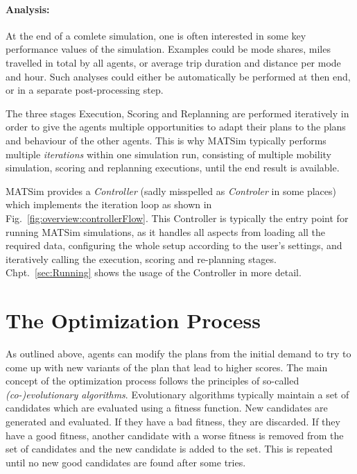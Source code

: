 \paragraph{Analysis:}
At the end of a comlete simulation, one is often interested in some key
performance values of the simulation. Examples could be mode shares, miles
travelled in total by all agents, or average trip duration and distance per
mode and hour. Such analyses could either be automatically be performed at then
end, or in a separate post-processing step.

\bigskip

The three stages Execution, Scoring and Replanning are performed iteratively in
order to give the agents multiple opportunities to adapt their plans to the
plans and behaviour of the other agents. This is why MATSim typically performs
multiple \emph{iterations} within one simulation run, consisting of multiple
mobility simulation, scoring and replanning executions, until the end result is
available.

MATSim provides a \emph{Controller} (sadly misspelled as \emph{Controler} in
some places) which implements the iteration loop as shown in
Fig.~\ref{fig:overview:controllerFlow}. This Controller is typically the entry
point for running MATSim simulations, as it handles all aspects from loading all
the required data, configuring the whole setup according to the user's settings,
and iteratively calling the execution, scoring and re-planning stages.
Chpt.~\ref{sec:Running} shows the usage of the Controller in more
detail.


\section{The Optimization Process}
\label{sec:Overview:Optimization}

As outlined above, agents can modify the plans from the initial demand to try to
come up with new variants of the plan that lead to higher scores. The main
concept of the optimization process follows the principles of so-called
\emph{(co-)evolutionary algorithms}. Evolutionary algorithms typically maintain
a set of candidates which are evaluated using a fitness function. New candidates are
generated and evaluated. If they have a bad fitness, they are discarded. If they
have a good fitness, another candidate with a worse fitness is removed from the
set of candidates and the new candidate is added to the set. This is repeated
until no new good candidates are found after some tries.

